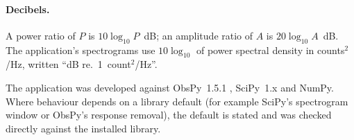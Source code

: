 \paragraph{Decibels.} A power ratio of $P$ is $10\log_{10}P$~dB; an amplitude ratio of $A$ is $20\log_{10}A$~dB. The
application's spectrograms use $10\log_{10}$ of power spectral density in counts$^2$/Hz, written
``dB re.\ 1~count$^2$/Hz''.

\begin{rs3dnote}
The application was developed against ObsPy~1.5.1 \parencite{beyreuther2010,krischer2015}, SciPy~1.x and
NumPy. Where behaviour depends on a library default (for example SciPy's spectrogram window or ObsPy's response
removal), the default is stated and was checked directly against the installed library.
\end{rs3dnote}
